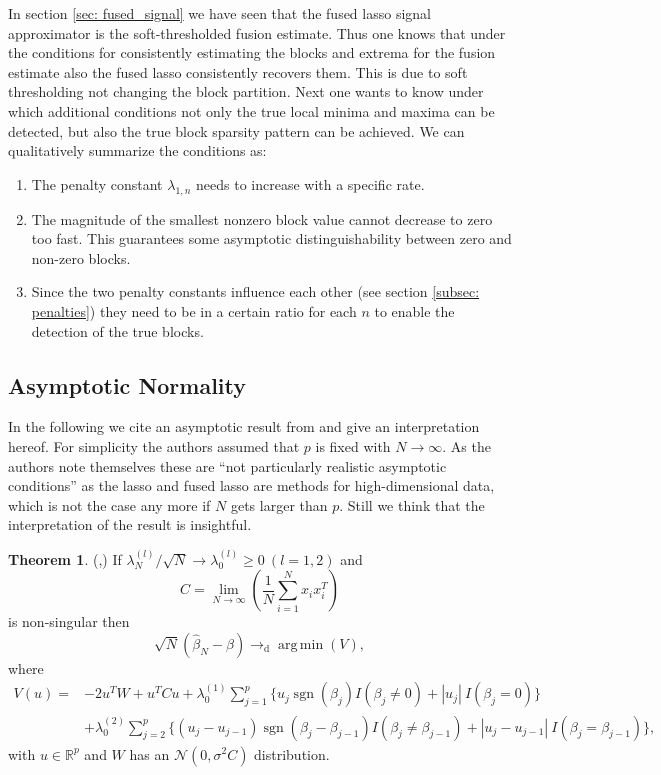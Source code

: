\documentclass{article}
\theoremstyle{definition}
\newtheorem{theorem}{Theorem}
\DeclareMathOperator*{\argmin}{arg\,min}
\DeclareMathOperator*{\sgn}{sgn}
\begin{document}
In section \eqref{sec: fused_signal} we have seen that the fused lasso signal approximator is the soft-thresholded fusion estimate. Thus one knows that under the conditions for consistently estimating the blocks and extrema for the fusion estimate also the fused lasso consistently recovers them. This is due to soft thresholding not changing the block partition. Next one wants to know under which additional conditions not only the true local minima and maxima can be detected, but also the true block sparsity pattern can be achieved. We can qualitatively summarize the conditions as:
\begin{enumerate}
	\item The penalty constant $\lambda_{1,n}$ needs to increase with a specific rate.
	\item The magnitude of the smallest nonzero block value cannot decrease to zero too fast. This guarantees some asymptotic distinguishability between zero and non-zero blocks.
	\item Since the two penalty constants influence each other (see section \eqref{subsec: penalties}) they need to be in a certain ratio for each $n$ to enable the detection of the true blocks.
\end{enumerate}

\subsection{Asymptotic Normality}
In the following we cite an asymptotic result from \citet{fused} and give an interpretation hereof.
For simplicity the authors assumed that $p$ is fixed with $N \rightarrow \infty$. As the authors note themselves these are ``not particularly realistic asymptotic conditions'' as the lasso and fused lasso are methods for high-dimensional data, which is not the case any more if $N$ gets larger than $p$. Still we think that the interpretation of the result is insightful.

\begin{theorem} (\citep{asymptoticslasso},\citep{fused}) \newline
	If $\lambda_N^{(l)}/\sqrt{N} \rightarrow \lambda_0^{(l)} \geq 0 \  (l=1,2)$ and
	\begin{equation*}
	C = \lim\limits_{N \rightarrow \infty}{(\frac{1}{N} \sum_{i=1}^{N}x_i x_i^T)}
	\end{equation*}
	is non-singular then
	\begin{equation*}
	\sqrt{N}(\hat{\beta}_N - \beta) \rightarrow_{\text{d}} \argmin(V),
	\end{equation*}
	where
	\begin{align*}
	V(u) = &-2u^T W + u^T Cu + \lambda_0^{(1)} \sum_{j=1}^{p} \{u_j \sgn(\beta_j)I(\beta_j \neq 0) + |u_j|\ I(\beta_j=0) \} \\
	&+ \lambda_0^{(2)} \sum_{j=2}^{p} \{(u_j - u_{j-1}) \sgn(\beta_j - \beta_{j-1})I(\beta_j \neq \beta_{j-1}) + |u_j-u_{j-1}|\ I(\beta_j=\beta_{j-1}) \}, 
	\end{align*}
	with $u \in \mathbb{R}^p$ and $W$ has an $\mathcal{N}(0,\sigma^2 C)$ distribution.
\end{theorem}
\end{document}
